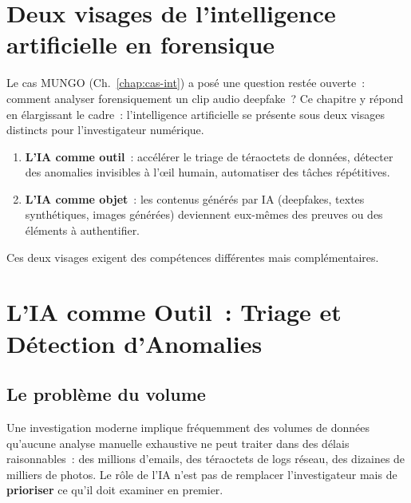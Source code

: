 \bigskip

\section*{Deux visages de l'intelligence artificielle en forensique}

Le cas MUNGO (Ch.~\ref{chap:cas-int}) a posé une question restée
ouverte~: comment analyser forensiquement un clip audio deepfake~?
Ce chapitre y répond en élargissant le cadre~: l'intelligence
artificielle se présente sous deux visages distincts pour
l'investigateur numérique.

\begin{enumerate}
    \item \textbf{L'IA comme outil}~: accélérer le triage de
          téraoctets de données, détecter des anomalies invisibles
          à l'\oe il humain, automatiser des tâches répétitives.
    \item \textbf{L'IA comme objet}~: les contenus générés par IA
          (deepfakes, textes synthétiques, images générées) deviennent
          eux-mêmes des preuves ou des éléments à authentifier.
\end{enumerate}

Ces deux visages exigent des compétences différentes mais
complémentaires.

\separateur

\section{L'IA comme Outil~: Triage et Détection d'Anomalies}
\label{sec:ia-outil}

\subsection{Le problème du volume}

Une investigation moderne implique fréquemment des volumes de données
qu'aucune analyse manuelle exhaustive ne peut traiter dans des délais
raisonnables~: des millions d'emails, des téraoctets de logs réseau,
des dizaines de milliers de photos. Le rôle de l'IA n'est pas de
remplacer l'investigateur mais de \textbf{prioriser} ce qu'il doit
examiner en premier.

